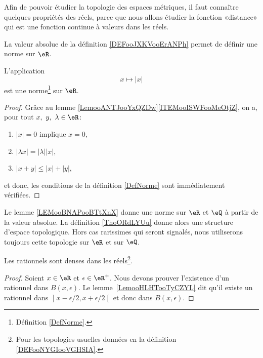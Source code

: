 Afin de pouvoir étudier la topologie des espaces métriques, il faut connaître quelques propriétés des réels, parce que nous allons étudier la fonction «distance» qui est une fonction continue à valeurs dans les réels.

La valeur absolue de la définition \ref{DEFooJXKVooErANPh} permet de définir une norme sur \( \eR\).
\begin{lemma}       \label{LEMooBNAPooBTtXnX}
	L'application
	\begin{equation}
		x\mapsto | x |
	\end{equation}
	est une norme\footnote{Définition \ref{DefNorme}.} sur \( \eR\).
\end{lemma}

\begin{proof}
	Grâce au lemme \ref{LemooANTJooYxQZDw}\ref{ITEMooISWFooMeOtjZ}, on a, pour tout \(x,\ y,\ \lambda \in \eR \):
	\begin{enumerate}
		\item \( | x |=0\) implique \( x=0\),
		\item \( | \lambda x |=| \lambda | |x |\),
		\item \( | x+y |\leq | x |+| y |\),
	\end{enumerate}
	et donc, les conditions de la définition \ref{DefNorme} sont immédiatement vérifiées.
\end{proof}

\begin{definition}      \label{DEFooNYGIooVGHSIA}
	Le lemme \ref{LEMooBNAPooBTtXnX} donne une norme sur \( \eR\) et \( \eQ\) à partir de la valeur absolue. La définition \ref{ThoORdLYUu} donne alors une structure d'espace topologique. Hors cas rarissimes qui seront signalés, nous utiliserons toujours cette topologie sur \( \eR\) et sur \( \eQ\).
\end{definition}

\begin{proposition}     \label{PropooUHNZooOUYIkn}
	Les rationnels sont denses dans les réels\footnote{Pour les topologies usuelles données en la définition \ref{DEFooNYGIooVGHSIA}.}.
\end{proposition}

\begin{proof}
	Soient \( x\in \eR\) et \( \epsilon\in \eR^+\). Nous devons prouver l'existence d'un rationnel dans \( B(x,\epsilon)\). Le lemme~\ref{LemooHLHTooTyCZYL} dit qu'il existe un rationnel dans \( \mathopen] x-\epsilon/2 , x+\epsilon/2 \mathclose[\) et donc dans \( B(x,\epsilon)\).
\end{proof}

